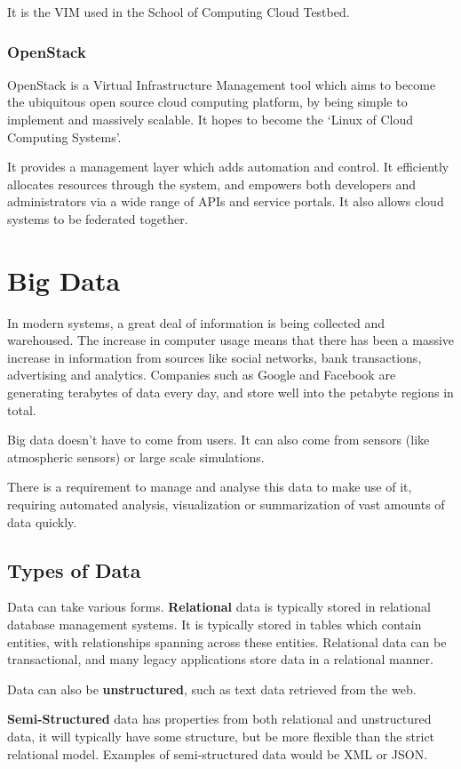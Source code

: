 \documentclass{article}
\begin{document}
It is the VIM used in the School of Computing Cloud Testbed.

\subsubsection{OpenStack}
OpenStack is a Virtual Infrastructure Management tool which aims to become the ubiquitous open source cloud computing platform, by being simple to implement and massively scalable. It hopes to become the `Linux of Cloud Computing Systems'. 

It provides a management layer which adds automation and control. It efficiently allocates resources through the system, and empowers both developers and administrators via a wide range of APIs and service portals. It also allows cloud systems to be federated together.

\section{Big Data}
In modern systems, a great deal of information is being collected and warehoused. The increase in computer usage means that there has been a massive increase in information from sources like social networks, bank transactions, advertising and analytics. Companies such as Google and Facebook are generating terabytes of data every day, and store well into the petabyte regions in total.

Big data doesn't have to come from users. It can also come from sensors (like atmospheric sensors) or large scale simulations.

There is a requirement to manage and analyse this data to make use of it, requiring automated analysis, visualization or summarization of vast amounts of data quickly. 

\subsection{Types of Data}
Data can take various forms. \textbf{Relational} data is typically stored in relational database management systems. It is typically stored in tables which contain entities, with relationships spanning across these entities. Relational data can be transactional, and many legacy applications store data in a relational manner. 

Data can also be \textbf{unstructured}, such as text data retrieved from the web. 

\textbf{Semi-Structured} data has properties from both relational and unstructured data, it will typically have some structure, but be more flexible than the strict relational model. Examples of semi-structured data would be XML or JSON. 
\end{document}
